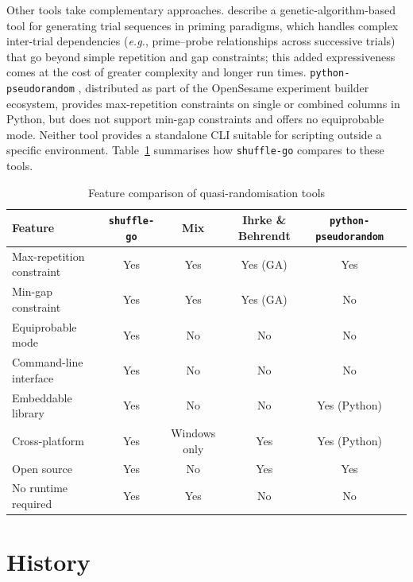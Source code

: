 \documentclass[doc,a4paper,biblatex]{apa7}
\begin{document}
Other tools take complementary approaches. \textcite{ihrke2011} describe
a genetic-algorithm-based tool for generating trial sequences in priming
paradigms, which handles complex inter-trial dependencies
(\textit{e.g.}, prime--probe relationships across successive trials) that
go beyond simple repetition and gap constraints; this added expressiveness
comes at the cost of greater complexity and longer run times.
\texttt{python-pseudorandom} \parencite{mathot2014}, distributed as part
of the OpenSesame experiment builder ecosystem, provides max-repetition
constraints on single or combined columns in Python, but does not support
min-gap constraints and offers no equiprobable mode. Neither tool provides
a standalone CLI suitable for scripting outside a specific environment.
Table~\ref{tab:comparison} summarises how \texttt{shuffle-go} compares
to these tools.

\begin{table}[ht]
\caption{Feature comparison of quasi-randomisation tools}
\label{tab:comparison}
\small
\begin{tabular}{@{}lccccc@{}}
\toprule
Feature & \texttt{shuffle-go} & Mix & Ihrke \& Behrendt & \texttt{python-pseudorandom} \\
\midrule
Max-repetition constraint   & Yes & Yes & Yes (GA) & Yes \\
Min-gap constraint          & Yes & Yes & Yes (GA) & No  \\
Equiprobable mode           & Yes & No  & No       & No  \\
Command-line interface      & Yes & No  & No       & No  \\
Embeddable library          & Yes & No  & No       & Yes (Python) \\
Cross-platform              & Yes & Windows only & Yes & Yes (Python) \\
Open source                 & Yes & No  & Yes      & Yes \\
No runtime required         & Yes & Yes & No       & No  \\
\bottomrule
\end{tabular}
\end{table}


\section{History}
\label{sec:history}
\end{document}
